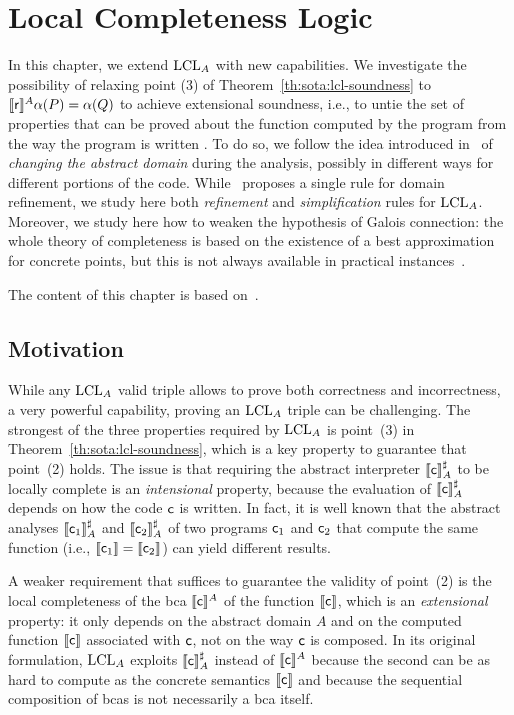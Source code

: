 
\chapter{Local Completeness Logic}\label{ch:lcla}

In this chapter, we extend $\text{LCL}_A$ with new capabilities. We investigate the possibility of relaxing point (3) of Theorem~\ref{th:sota:lcl-soundness} to $\llbracket\mathsf{r}\rrbracket^{A} \alpha(P) = \alpha(Q)$ to achieve extensional soundness, i.e., to untie the set of properties that can be proved about the function computed by the program from the way the program is written . To do so, we follow the idea introduced in~\cite[§8]{BGGR23} of \emph{changing the abstract domain} during the analysis, possibly in different ways for different portions of the code.
While~\cite{BGGR23} proposes a single rule for domain refinement, we study here both \emph{refinement} and \emph{simplification} rules for $\text{LCL}_A$.
Moreover, we study here how to weaken the hypothesis of Galois connection: the whole theory of completeness is based on the existence of a best approximation for concrete points, but this is not always available in practical instances~\cite{CC92}.

The content of this chapter is based on~\cite{ABG23}.

\section{Motivation}
While any $\text{LCL}_A$ valid triple allows to prove both correctness and incorrectness, a very powerful capability, proving an $\text{LCL}_A$ triple can be challenging.
The strongest of the three properties required by $\text{LCL}_A$ is point~(3) in Theorem~\ref{th:sota:lcl-soundness}, which is a key property to guarantee that point~(2) holds.
The issue is that requiring the abstract interpreter $\llbracket\mathsf{c}\rrbracket^{\sharp}_{A}$ to be locally complete is an \emph{intensional} property, because the evaluation of $\llbracket\mathsf{c}\rrbracket^{\sharp}_{A}$ depends on how the code $\mathsf{c}$ is written.
In fact, it is well known that the abstract analyses $\llbracket\mathsf{c}_1\rrbracket^{\sharp}_{A}$ and $\llbracket\mathsf{c}_2\rrbracket^{\sharp}_{A}$ of two programs $\mathsf{c}_1$ and $\mathsf{c}_2$ that compute the same function (i.e., $\llbracket\mathsf{c}_1\rrbracket=\llbracket\mathsf{c}_2\rrbracket$) can yield different results.

A weaker requirement that suffices to guarantee the validity of point~(2) is the local completeness of the bca $\llbracket\mathsf{c}\rrbracket^{A}$ of the function $\llbracket\mathsf{c}\rrbracket$, which is an \emph{extensional} property: it only depends on the abstract domain $A$ and on the computed function $\llbracket\mathsf{c}\rrbracket$ associated with $\mathsf{c}$, not on the way $\mathsf{c}$ is composed. In its original formulation, $\text{LCL}_A$ exploits $\llbracket\mathsf{c}\rrbracket^{\sharp}_{A}$ instead of $\llbracket\mathsf{c}\rrbracket^{A}$ because the second can be as hard to compute as the concrete semantics $\llbracket\mathsf{c}\rrbracket$ and because the sequential composition of bcas is not necessarily a bca itself.

